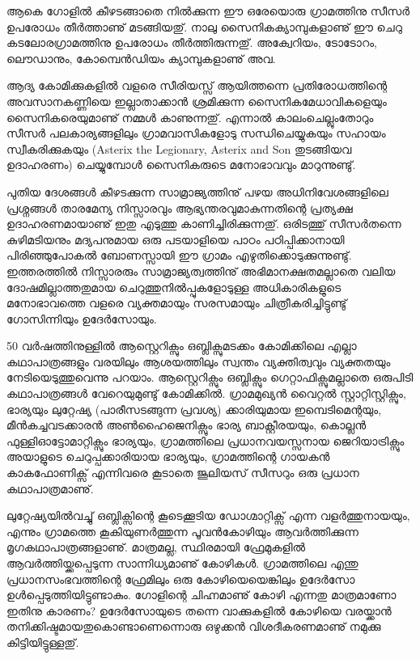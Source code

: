 ആകെ ഗോളില്‍ കീഴടങ്ങാതെ നില്‍ക്കുന്ന ഈ ഒരേയൊരു ഗ്രാമത്തിനു സീസര്‍ ഉപരോധം തീര്‍ത്താണു് മടങ്ങിയതു്. 
നാലു സൈനികക്യാമ്പുകളാണു് ഈ ചെറു കടലോരഗ്രാമത്തിനു ഉപരോധം തീര്‍ത്തിരുന്നതു്. അക്വേറിയം, ടോടോറം, 
ലൌഡാനും, കോമ്പെന്‍ഡിയം ക്യാമ്പുകളാണു് അവ.

ആദ്യ കോമിക്കുകളില്‍ വളരെ സീരിയസ്സ് ആയിത്തന്നെ പ്രതിരോധത്തിന്റെ അവസാനകണ്ണിയെ ഇല്ലാതാക്കാന്‍ 
ശ്രമിക്കുന്ന സൈനികമേധാവികളെയും സൈനികരെയുമാണു് നമ്മള്‍ കാണുന്നതു്. എന്നാല്‍ കാലംചെല്ലുംതോറും 
സീസര്‍ പലകാര്യങ്ങളിലും ഗ്രാമവാസികളോടു സന്ധിചെയ്യുകയും സഹായം സ്വീകരിക്കുകയും (Asterix the
Legionary, Asterix and Son തുടങ്ങിയവ ഉദാഹരണം) ചെയ്യുമ്പോള്‍ സൈനികരുടെ മനോഭാവവും മാറുന്നുണ്ടു്.

പുതിയ ദേശങ്ങള്‍ കീഴടക്കുന്ന സാമ്രാജ്യത്തിനു് പഴയ അധിനിവേശങ്ങളിലെ പ്രശ്നങ്ങള്‍ താരമേന്യ നിസ്സാരവും 
ആഭ്യന്തരവുമാകുന്നതിന്റെ പ്രത്യക്ഷ ഉദാഹരണമായാണു് ഇതു എടുത്തു കാണിച്ചിരിക്കുന്നതു്. ഒരിടത്തു് സീസര്‍തന്നെ 
കുഴിമടിയനും മദ്യപനുമായ ഒരു പടയാളിയെ പാഠം പഠിപ്പിക്കാനായി പിരിഞ്ഞുപോകല്‍ ബോണസ്സായി ഈ ഗ്രാമം 
എഴുതിക്കൊടുക്കുന്നുണ്ടു്. ഇത്തരത്തില്‍ നിസ്സാരരും സാമ്രാജ്യത്വത്തിനു് അഭിമാനക്ഷതമല്ലാതെ വലിയ ദോഷമില്ലാത്തതുമായ 
ചെറുത്തുനില്‍പ്പുകളോടുള്ള അധികാരികളുടെ മനോഭാവത്തെ വളരെ വ്യക്തമായും സരസമായും ചിത്രീകരിച്ചിട്ടുണ്ടു് 
ഗോസിന്നിയും ഉദേര്‍സോയും.

50 വര്‍ഷത്തിനുള്ളില്‍ ആസ്റ്റെറിക്സും ഒബ്ലിക്സുമടക്കം കോമിക്കിലെ എല്ലാ കഥാപാത്രങ്ങളും വരയിലും ആശയത്തിലും സ്വന്തം 
വ്യക്തിത്വവും വ്യക്തതയും നേടിയെടുത്തുവെന്നു പറയാം. ആസ്റ്റെറിക്സും ഒബ്ലിക്സും ഗെറ്റാഫിക്സുമല്ലാതെ ഒരുപിടി കഥാപാത്രങ്ങള്‍ 
വേറെയുമുണ്ടു് കോമിക്കില്‍. ഗ്രാമമുഖ്യന്‍ വൈറ്റല്‍ സ്റ്റാറ്റിസ്റ്റിക്സും, ഭാര്യയും ലുറ്റേഷ്യ (പാരീസടങ്ങുന്ന പ്രവശ്യ) ക്കാരിയുമായ 
ഇമ്പെടിമെന്റയും, മീന്‍കച്ചവടക്കാരന്‍ അണ്‍ഹൈജെനിക്സും ഭാര്യ ബാക്റ്റീരയയും, കൊല്ലന്‍ ഫുള്ളിഓട്ടോമാറ്റിക്സും ഭാര്യയും, 
ഗ്രാമത്തിലെ പ്രധാനവയസ്സനായ ജെറിയാട്രിക്സും അയാളുടെ ചെറുപ്പക്കാരിയായ ഭാര്യയും, ഗ്രാമത്തിന്റെ ഗായകന്‍ 
കാകഫോണിക്സ് എന്നിവരെ കൂടാതെ ജൂലിയസ് സീസറും ഒരു പ്രധാന കഥാപാത്രമാണു്.


ലുറ്റേഷ്യയില്‍വച്ചു് ഒബ്ലിക്സിന്റെ കൂടെക്കൂടിയ ഡോഗ്മാറ്റിക്സ് എന്ന വളര്‍ത്തുനായയും, എന്നും ഗ്രാമത്തെ കൂകിയുണര്‍ത്തുന്ന 
പൂവന്‍കോഴിയും ആവര്‍ത്തിക്കുന്ന മൃഗകഥാപാത്രങ്ങളാണു്. മാത്രമല്ല, സ്ഥിരമായി ഫ്രേമുകളില്‍ ആവര്‍ത്തിയ്ക്കപ്പെടുന്ന 
സാന്നിധ്യമാണു് കോഴികള്‍. ഗ്രാമത്തിലെ എന്തു പ്രധാനസംഭവത്തിന്റെ ഫ്രേമിലും ഒരു കോഴിയെയെങ്കിലും ഉദേര്‍സോ 
ഉള്‍പ്പെടുത്തിയിട്ടുണ്ടാകും. ഗോളിന്റെ ചിഹ്നമാണു് കോഴി എന്നതു മാത്രമാണോ ഇതിനു കാരണം? ഉദേര്‍സോയുടെ തന്നെ 
വാക്കുകളില്‍ കോഴിയെ വരയ്ക്കാന്‍ തനിക്കിഷ്ടമായതുകൊണ്ടാണെന്നൊരു ഒഴുക്കന്‍ വിശദീകരണമാണു് നമുക്കു കിട്ടിയിട്ടുള്ളതു്.

